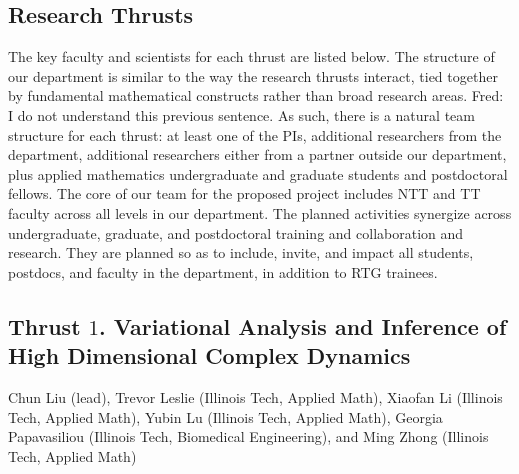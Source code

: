 \documentclass[11pt]{NSFamsart}
\newcommand{\FredNote}[1]{{\color{blue} Fred: #1}}
\begin{document}
\subsection{Research Thrusts} \label{sec:researchproblems}



The key faculty and scientists for each thrust are listed below. 
The structure of our department is similar to the way the research thrusts interact, tied together by fundamental mathematical constructs rather than broad research areas. \FredNote{I do not understand this previous sentence.} As such, there is a natural team structure for each thrust:  at least one of the PIs,  additional researchers from the department, additional researchers either from a partner outside our department, %
plus applied mathematics undergraduate and graduate students and postdoctoral fellows.
The core of our team for the proposed project includes NTT and TT faculty across all levels in our department. The planned activities synergize across undergraduate, graduate, and postdoctoral training and collaboration and research. They are planned so as to include, invite, and impact all students, postdocs, and faculty in the department, in addition to RTG trainees.




\subsection*{Thrust $1$. Variational Analysis and Inference of High Dimensional Complex Dynamics}
Chun Liu (lead), Trevor Leslie (Illinois Tech, Applied Math), Xiaofan Li (Illinois Tech, Applied Math), Yubin Lu (Illinois Tech, Applied Math), Georgia Papavasiliou (Illinois Tech, Biomedical Engineering), and Ming Zhong (Illinois Tech, Applied Math)
\end{document}
